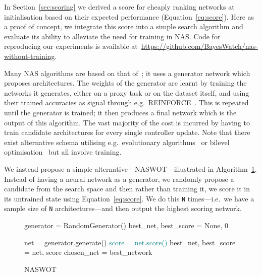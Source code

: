\documentclass{article}
\begin{document}
In Section~\ref{sec:scoring} we derived a score for cheaply ranking networks at initialisation based on their expected performance (Equation~\ref{eq:score}). Here as a proof of concept, we integrate this score into a simple search algorithm and evaluate its ability to alleviate the need for training in NAS. Code for reproducing our experiments is available at~\url{https://github.com/BayesWatch/nas-without-training}.




Many NAS algorithms are based on that of~\cite{zoph2017neural}; it uses a generator network which proposes architectures. The weights of the generator are learnt by training the networks it generates, either on a proxy task or on the dataset itself, and using their trained accuracies as signal through e.g.\ REINFORCE~\citep{williams1992simple}. This is repeated until the generator is trained; it then produces a final network which is the output of this algorithm. The vast majority of the cost is incurred by having to train candidate architectures for every single controller update. Note that there exist alternative schema utilising e.g.\ evolutionary algorithms~\citep{real2019regularized} or bilevel optimisation~\citep{liu2019darts} but all involve training.


We instead propose a simple alternative---NASWOT---illustrated in Algorithm~\ref{algo:ours}. Instead of having a neural network as a generator, we randomly propose a candidate from the search space and then rather than training it, we score it in its untrained state using Equation~\ref{eq:score}. We do this \texttt{N} times---i.e.\ we have a sample size of \texttt{N} architectures---and then output the highest scoring network.

\begin{figure}
{\tiny
\vspace{-4mm}
    \begin{algorithm}[H]
    \caption{NASWOT}
    \begin{algorithmic}[h]
          \State  generator = RandomGenerator() 
                \State best\_net, best\_score = None, 0 
    

          
              \State net = generator.generate()
        \State \textcolor{teal}{score = net.score()} 
         \State best\_net, best\_score = net, score 
        \EndIf
        \EndFor
    \State chosen\_net = best\_network
    
    
    \end{algorithmic}
    
    \label{algo:ours}
    \end{algorithm}
    
    }
    \vspace{-8mm}
\end{figure}
\end{document}
